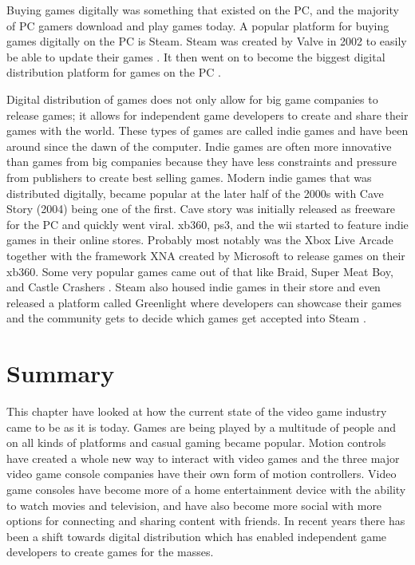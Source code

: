 Buying games digitally was something that existed on the PC, and the majority of PC gamers download and play games today. A popular platform for buying games digitally on the PC is Steam. Steam was created by Valve in 2002 to easily be able to update their games \cite{2012eurogamer}. It then went on to become the biggest digital distribution platform for games on the PC \cite{2009gamasutra}.

Digital distribution of games does not only allow for big game companies to release games; it allows for independent game developers to create and share their games with the world. These types of games are called indie games and have been around since the dawn of the computer. Indie games are often more innovative than games from big companies because they have less constraints and pressure from publishers to create best selling games. Modern indie games that was distributed digitally, became popular at the later half of the 2000s with Cave Story (2004) being one of the first. Cave story was initially released as freeware for the PC and quickly went viral. \gls{xb360}, \gls{ps3}, and the \gls{wii} started to feature indie games in their online stores. Probably most notably was the Xbox Live Arcade together with the framework XNA created by Microsoft to release games on their \gls{xb360}. Some very popular games came out of that like Braid, Super Meat Boy, and Castle Crashers \cite{2015eurogamer}. Steam also housed indie games in their store and even released a platform called Greenlight where developers can showcase their games and the community gets to decide which games get accepted into Steam \cite{2015watlington}.

\section{Summary}
This chapter have looked at how the current state of the video game industry came to be as it is today. Games are being played by a multitude of people and on all kinds of platforms and casual gaming became popular.
Motion controls have created a whole new way to interact with video games and the three major video game console companies have their own form of motion controllers.
Video game consoles have become more of a home entertainment device with the ability to watch movies and television, and have also become more social with more options for connecting and sharing content with friends. 
In recent years there has been a shift towards digital distribution which has enabled independent game developers to create games for the masses.

